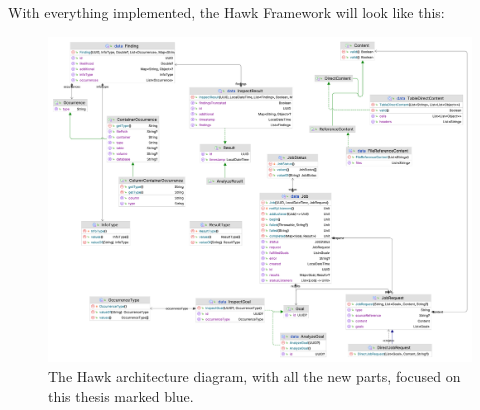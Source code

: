 With everything implemented, the Hawk Framework will look like this:
\begin{figure}[!htb]
  \centering

  \includegraphics[width=0.95\columnwidth]{hawk-dlp-uml.png}

  \caption[Hawk architecture]{The Hawk architecture diagram, with all the new parts, focused on this thesis marked blue.}  
  \label{fig:hawk}
\end{figure}




